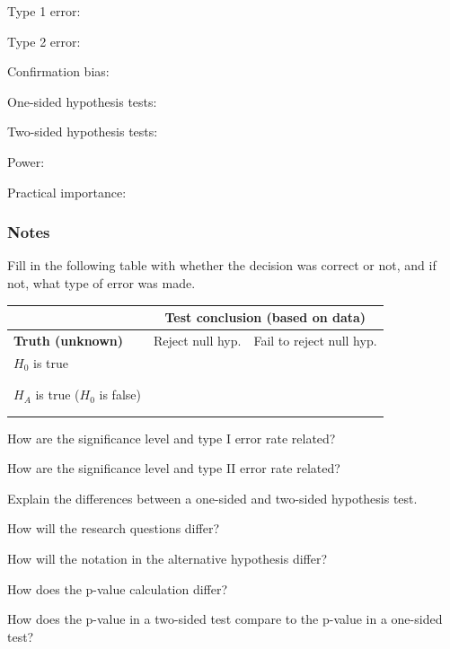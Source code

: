 \documentclass[
]{report}
\newcommand{\rgs}{\vspace{12pt}} %
\newcommand{\rgi}{\hspace{24pt}}  %
\begin{document}
Type 1 error:
\rgs

Type 2 error:
\rgs

Confirmation bias:
\rgs

One-sided hypothesis tests:
\rgs

Two-sided hypothesis tests:
\rgs

Power:
\rgs

Practical importance:
\rgs

\hypertarget{notes-19}{%
\subsubsection*{Notes}\label{notes-19}}

Fill in the following table with whether the decision was correct or not, and if not, what type of error was made.

\begin{center}
\begin{tabular}{|p{2in}|p{2in}|p{2in}|}
\hline
 & \multicolumn{2}{|c|}{\textbf{Test conclusion (based on data)}} \\ \hline
 \textbf{Truth (unknown)} & Reject null hyp. & Fail to reject null hyp. \\ \hline
 $H_0$ is true && \\ 
   & & \\ 
   & & \\ \hline
 $H_A$ is true ($H_0$ is false)  && \\ 
   & & \\ 
   & & \\ \hline
\end{tabular}
\end{center}

\rgs

How are the significance level and type I error rate related?
\rgs

How are the significance level and type II error rate related?
\rgs

Explain the differences between a one-sided and two-sided hypothesis test.
\vspace{1mm}

\rgi How will the research questions differ?
\rgs

\rgi How will the notation in the alternative hypothesis differ?
\rgs

\rgi How does the p-value calculation differ?
\rgs

How does the p-value in a two-sided test compare to the p-value in a one-sided test?
\rgs
\end{document}
